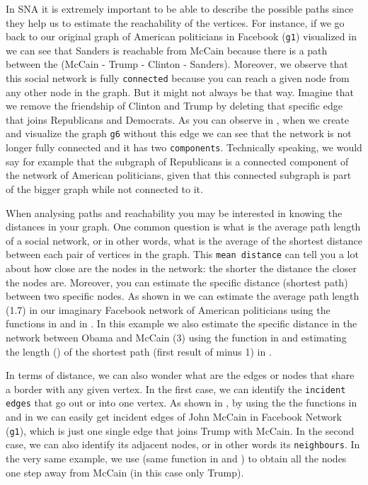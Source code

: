 In SNA it is extremely important to be able to describe the possible paths since they help us to estimate the reachability of the vertices. For instance, if we go back to our original graph of American politicians in Facebook (\texttt{g1}) visualized in  we can see that Sanders is reachable from McCain because there is a path between the (McCain - Trump - Clinton - Sanders).  Moreover, we observe that this social network is fully \texttt{connected} because you can reach a given node from any other node in the graph. But it might not always be that way. Imagine that we remove the friendship of Clinton and Trump by deleting that specific edge that joins Republicans and Democrats. As you can observe in , when we create and visualize the graph \texttt{g6} without this edge we can see that the network is not longer fully connected and it has two \texttt{components}. Technically speaking, we would say for example that the subgraph of Republicans is a connected component of the network of American politicians, given that this connected subgraph is part of the bigger graph while not connected to it.


When analysing paths and reachability you may be interested in knowing the distances in your graph. One common question is what is the average path length of a social network, or in other words, what is the average of the shortest distance between each pair of vertices in the graph. This \texttt{mean distance} can tell you a lot about how close are the nodes in the network: the shorter the distance the closer the nodes are. Moreover, you can estimate the specific distance (shortest path) between two specific nodes.  As shown in  we can estimate the average path length (1.7) in our imaginary Facebook network of American politicians using the functions  in  and  in . In this example we also estimate the specific distance in the network between Obama and McCain (3) using the function  in  and estimating the length () of the shortest path (first result of  minus 1) in .


In terms of distance, we can also wonder what are the edges or nodes that share a border with any given vertex. In the first case, we can identify the \texttt{incident edges} that go out or into one vertex. As shown in , by using the the functions  in  and  in  we can easily get incident edges of John McCain in Facebook Network (\texttt{g1}), which is just one single edge that joins Trump with McCain. In the second case, we can also identify its adjacent nodes, or in other words its \texttt{neighbours}. In the very same example, we use  (same function in  and ) to obtain all the nodes one step away from McCain (in this case only Trump).

